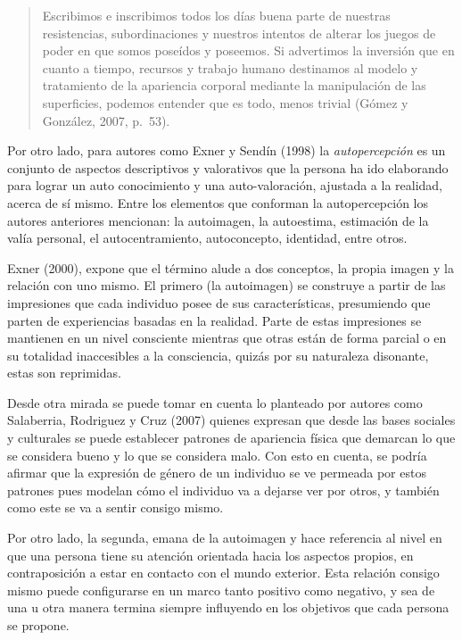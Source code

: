 \begin{quote}
Escribimos e inscribimos todos los días buena parte de nuestras
resistencias, subordinaciones y nuestros intentos de alterar los juegos de
poder en que somos poseídos y poseemos.
Si advertimos la inversión que en cuanto a tiempo, recursos y trabajo humano
destinamos al modelo y tratamiento de la apariencia corporal mediante la
manipulación de las superficies, podemos entender que es todo, menos trivial
(Gómez y González, 2007, p.~53).
\end{quote}

Por otro lado, para autores como Exner y Sendín (1998) la \emph{autopercepción}
es un
conjunto de aspectos descriptivos y valorativos que la persona ha ido elaborando
para lograr un auto conocimiento y una auto-valoración, ajustada a la realidad,
acerca de sí mismo.
Entre los elementos que conforman la autopercepción los autores
anteriores mencionan: la autoimagen, la autoestima, estimación de la valía
personal, el autocentramiento, autoconcepto, identidad, entre otros.

Exner (2000), expone que el término alude a dos conceptos, la propia imagen y la
relación con uno mismo.
El primero (la autoimagen) se construye a partir de las impresiones que cada
individuo posee de sus características, presumiendo que parten de experiencias
basadas en la realidad.
Parte de estas impresiones se mantienen en un nivel consciente mientras que
otras están de forma parcial o en su totalidad inaccesibles a la consciencia,
quizás por su naturaleza disonante, estas son reprimidas.

Desde otra mirada se puede tomar en cuenta lo planteado por autores como
Salaberria, Rodriguez y Cruz (2007) quienes expresan que desde las bases
sociales y culturales se puede establecer patrones de apariencia física que
demarcan lo que se considera bueno y lo que se considera malo. Con esto en
cuenta, se podría afirmar que la expresión de género de un individuo se ve
permeada por estos patrones pues modelan cómo el individuo va a dejarse ver por
otros, y también como este se va a sentir consigo mismo.

Por otro lado, la segunda, emana de la autoimagen y hace referencia al nivel en
que una persona tiene su atención orientada hacia los aspectos propios, en
contraposición a estar en contacto con el mundo exterior.
Esta relación consigo mismo puede configurarse en un marco tanto positivo como
negativo, y sea de una u otra manera termina siempre influyendo en los objetivos
que cada persona se propone.

